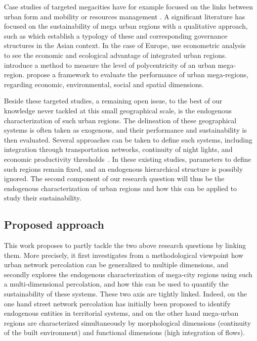 \documentclass{jimis-en}
\begin{document}
Case studies of targeted megacities have for example focused on the links between urban form and mobility or resources management \citep{sorensen2010megacities}. A significant literature has focused on the sustainability of mega urban regions with a qualitative approach, such as \cite{laquian2011planning} which establish a typology of these and corresponding governance structures in the Asian context. In the case of Europe, \cite{marull2013emerging} use econometric analysis to see the economic and ecological advantage of integrated urban regions. \cite{feng2018spatiotemporal} introduce a method to measure the level of polycentricity of an urban mega-region. \cite{su2017china} propose a framework to evaluate the performance of urban mega-regions, regarding economic, environmental, social and spatial dimensions.

Beside these targeted studies, a remaining open issue, to the best of our knowledge never tackled at this small geographical scale, is the endogenous characterization of such urban regions. The delineation of these geographical systems is often taken as exogenous, and their performance and sustainability is then evaluated. Several approaches can be taken to define such systems, including integration through transportation networks, continuity of night lights, and economic productivity thresholds~\citep{lang2005beyond,florida2008rise}. In these existing studies, parameters to define such regions remain fixed, and an endogenous hierarchical structure is possibly ignored. The second component of our research question will thus be the endogenous characterization of urban regions and how this can be applied to study their sustainability.



\subsection{Proposed approach}

This work proposes to partly tackle the two above research questions by linking them. More precisely, it first investigates from a methodological viewpoint how urban network percolation can be generalized to multiple dimensions, and secondly explores the endogenous characterization of mega-city regions using such a multi-dimensional percolation, and how this can be used to quantify the sustainability of these systems. These two axis are tightly linked. Indeed, on the one hand street network percolation has initially been proposed to identify endogenous entities in territorial systems, and on the other hand mega-urban regions are characterized simultaneously by morphological dimensions (continuity of the built environment) and functional dimensions (high integration of flows).
\end{document}
